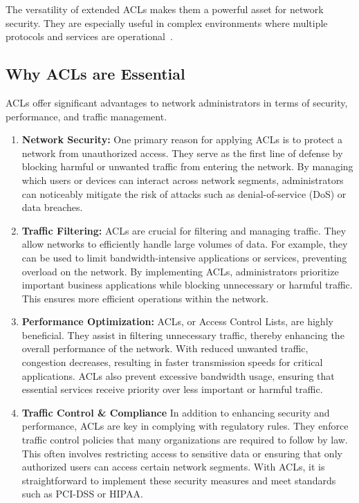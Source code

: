 \documentclass[11pt,a4paper]{article}
\begin{document}
        The versatility of extended ACLs makes them a powerful asset for network security. They are especially useful in complex environments where multiple protocols and services are operational~\cite{std-ext}.
    

    
    \subsection*{Why ACLs are Essential}

        ACLs offer significant advantages to network administrators in terms of security, performance, and traffic management.

        \begin{enumerate}
            \item \textbf{Network Security:} One primary reason for applying ACLs is to protect a network from unauthorized access. They serve as the first line of defense by blocking harmful or unwanted traffic from entering the network. By managing which users or devices can interact across network segments, administrators can noticeably mitigate the risk of attacks such as denial-of-service (DoS) or data breaches.
    
            \item \textbf{Traffic Filtering:} ACLs are crucial for filtering and managing traffic. They allow networks to efficiently handle large volumes of data. For example, they can be used to limit bandwidth-intensive applications or services, preventing overload on the network. By implementing ACLs, administrators prioritize important business applications while blocking unnecessary or harmful traffic. This ensures more efficient operations within the network.
    
            \item \textbf{Performance Optimization:} ACLs, or Access Control Lists, are highly beneficial. They assist in filtering unnecessary traffic, thereby enhancing the overall performance of the network. With reduced unwanted traffic, congestion decreases, resulting in faster transmission speeds for critical applications. ACLs also prevent excessive bandwidth usage, ensuring that essential services receive priority over less important or harmful traffic.

            \item \textbf{Traffic Control \& Compliance} In addition to enhancing security and performance, ACLs are key in complying with regulatory rules. They enforce traffic control policies that many organizations are required to follow by law. This often involves restricting access to sensitive data or ensuring that only authorized users can access certain network segments. With ACLs, it is straightforward to implement these security measures and meet standards such as PCI-DSS or HIPAA.
        \end{enumerate}
\end{document}
